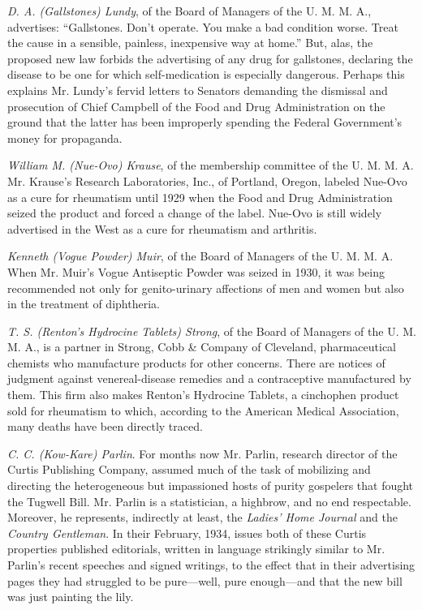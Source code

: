 \documentclass[nohyper,openany,nobib]{tufte-book}
\begin{document}
\emph{D. A. (Gallstones) Lundy}, of the Board of Managers of the U. M.
M. A., advertises: ``Gallstones. Don't operate. You make a bad condition
worse. Treat the cause in a sensible, painless, inexpensive way at
home.'' But, alas, the proposed new law forbids the advertising of any
drug for gallstones, declaring the disease to be one for which
self-medication is especially dangerous. Perhaps this explains Mr.
Lundy's fervid letters to Senators demanding the dismissal and
prosecution of Chief Campbell of the Food and Drug Administration on the
ground that the latter has been improperly spending the Federal
Government's money for propaganda.

\emph{William M. (Nue-Ovo) Krause}, of the membership committee of the
U. M. M. A. Mr. Krause's Research Laboratories, Inc., of Portland,
Oregon, labeled Nue-Ovo as a cure for rheumatism until 1929 when the
Food and Drug Administration seized the product and forced a change of
the label. Nue-Ovo is still widely advertised in the West as a cure for
rheumatism and arthritis.

\emph{Kenneth (Vogue Powder) Muir}, of the Board of Managers of the U.
M. M. A. When Mr. Muir's Vogue Antiseptic Powder was seized in 1930, it
was being recommended not only for genito-urinary affections of men and
women but also in the treatment of diphtheria.

\emph{T. S. (Renton's Hydrocine Tablets) Strong}, of the Board of
Managers of the U. M. M. A., is a partner in Strong, Cobb \& Company of
Cleveland, pharmaceutical chemists who manufacture products for other
concerns. There are notices of judgment against venereal-disease
remedies and a contraceptive manufactured by them. This firm also makes
Renton's Hydrocine Tablets, a cinchophen product sold for rheumatism to
which, according to the American Medical Association, many deaths have
been directly traced.

\emph{C. C. (Kow-Kare) Parlin}. For months now Mr. Parlin, research
director of the Curtis Publishing Company, assumed much of the task of
mobilizing and directing the heterogeneous but impassioned hosts of
purity gospelers that fought the Tugwell Bill. Mr. Parlin is a
statistician, a highbrow, and no end respectable. Moreover, he
represents, indirectly at least, the \emph{Ladies' Home Journal} and the
\emph{Country Gentleman}. In their February, 1934, issues both of these
Curtis properties published editorials, written in language strikingly
similar to Mr. Parlin's recent speeches and signed writings, to the
effect that in their advertising pages they had struggled to be
pure---well, pure enough---and that the new bill was just painting the
lily.
\end{document}

